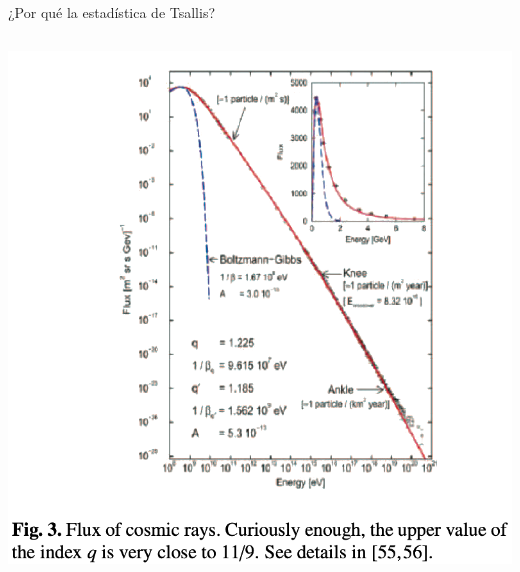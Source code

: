 \documentclass{beamer}
\begin{document}
\begin{frame}{¿Por qué la estadística de Tsallis?}
\begin{columns}
{\begin{columns}
        \includegraphics[width=\linewidth]{figures/cosmic_rays_fit.png}
      \end{columns}
    }

  \end{columns}
\end{frame}
\end{document}

